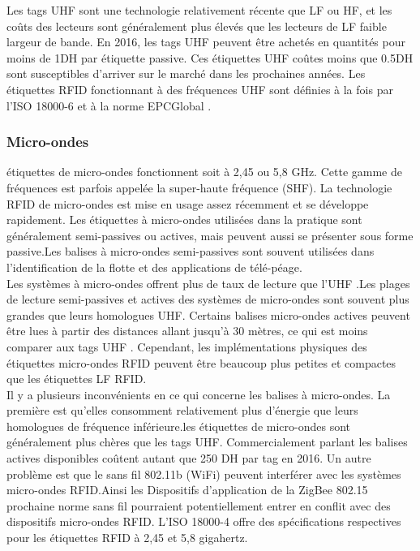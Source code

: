 \documentclass[11pt, a4paper, twoside]{book}
\begin{document}
Les tags UHF sont une technologie relativement récente que LF ou HF, et les coûts des lecteurs sont généralement plus élevés que les lecteurs de LF faible largeur de bande. En 2016, les tags UHF peuvent être achetés en quantités pour moins de 1DH par étiquette passive. Ces étiquettes UHF coûtes moins que  0.5DH sont susceptibles d'arriver sur le marché dans les prochaines années. Les étiquettes RFID fonctionnant à des fréquences UHF sont définies à la fois par l'ISO 18000-6 \cite{iso6} et à la norme EPCGlobal \cite{air} .
\subsubsection{Micro-ondes} 
étiquettes de micro-ondes fonctionnent soit à 2,45 ou 5,8 GHz. Cette gamme de fréquences est parfois appelée la super-haute fréquence (SHF). La technologie RFID de micro-ondes est mise en usage assez récemment et se développe rapidement. Les étiquettes à micro-ondes utilisées dans la pratique sont généralement semi-passives ou actives, mais peuvent aussi se présenter sous forme passive.Les balises à micro-ondes semi-passives sont souvent utilisées dans l'identification de la flotte et des applications de télé-péage.\\


Les systèmes à micro-ondes offrent plus de taux de lecture que l'UHF .Les plages de lecture semi-passives et actives des systèmes de micro-ondes sont souvent plus grandes que leurs homologues UHF. Certains balises micro-ondes actives peuvent être lues à partir des distances allant jusqu'à 30 mètres, ce qui est moins comparer aux tags UHF . Cependant, les implémentations physiques des étiquettes micro-ondes  RFID peuvent être beaucoup plus petites et compactes que les étiquettes LF  RFID.\\


Il y a plusieurs inconvénients en ce qui concerne les balises à micro-ondes. La première est qu'elles consomment relativement plus d'énergie que leurs homologues de fréquence inférieure.les étiquettes de micro-ondes sont généralement plus chères que les tags UHF. Commercialement parlant les balises actives disponibles coûtent autant que 250 DH par tag en 2016.
Un autre problème est que le sans fil 802.11b (WiFi) \cite{802.11b} peuvent interférer avec les systèmes micro-ondes RFID.Ainsi les Dispositifs d'application de la ZigBee 802.15  \cite{802.15.4} prochaine norme sans fil pourraient potentiellement entrer en conflit avec des dispositifs micro-ondes RFID.
L'ISO 18000-4 \cite{iso4} offre des spécifications respectives pour les étiquettes RFID à 2,45 et 5,8 gigahertz. 
\end{document}
